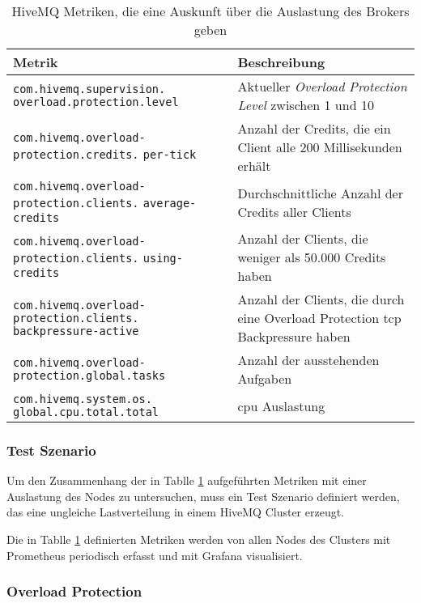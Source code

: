 \begin{table}[htbp]
\centering
\renewcommand{\arraystretch}{1.5}
\begin{tabularx}{\textwidth}{|p{5cm}|X|}
    \hline
    \textbf{Metrik} & \textbf{Beschreibung} \\
    \hline
    \hline
    \verb|com.hivemq.supervision.| \verb|overload.protection.level| & Aktueller \textit{Overload Protection Level} zwischen 1 und 10 \\
    \hline
    \verb|com.hivemq.overload-| \verb|protection.credits.| \verb|per-tick| & Anzahl der Credits, die ein Client alle 200 Millisekunden erhält \\
    \hline
    \verb|com.hivemq.overload-| \verb|protection.clients.| \verb|average-credits| & Durchschnittliche Anzahl der Credits aller Clients \\
    \hline
    \verb|com.hivemq.overload-| \verb|protection.clients.| \verb|using-credits| & Anzahl der Clients, die weniger als 50.000 Credits haben \\
    \hline
    \verb|com.hivemq.overload-| \verb|protection.clients.| \verb|backpressure-active| & Anzahl der Clients, die durch eine Overload Protection \ac{tcp} Backpressure haben \\
    \hline
    \verb|com.hivemq.overload-| \verb|protection.global.tasks| & Anzahl der ausstehenden Aufgaben \\
    \hline
    \verb|com.hivemq.system.os.| \verb|global.cpu.total.total| & \ac{cpu} Auslastung \\
    \hline
\end{tabularx}
\caption{HiveMQ Metriken, die eine Auskunft über die Auslastung des Brokers geben}
\label{table:overload-protection-metrics}
\end{table}

\subsubsection{Test Szenario}
Um den Zusammenhang der in Tablle \ref{table:overload-protection-metrics} aufgeführten Metriken mit einer Auslastung des Nodes zu untersuchen, muss ein Test Szenario definiert werden, das eine ungleiche Lastverteilung in einem HiveMQ Cluster erzeugt.

Die in Tablle \ref{table:overload-protection-metrics} definierten Metriken werden von allen Nodes des Clusters mit Prometheus periodisch erfasst und mit Grafana visualisiert.

\subsubsection{Overload Protection}
